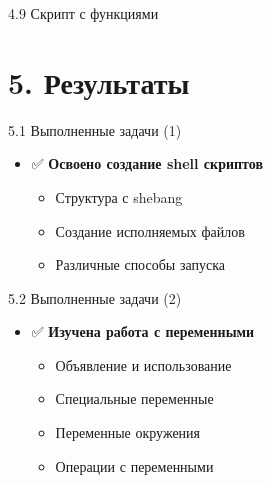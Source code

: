 \documentclass[
  ignorenonframetext,
  aspectratio=169,
  russian,
]{beamer}
\newenvironment{Shaded}{\begin{snugshade}}{\end{snugshade}}
\newcommand{\BuiltInTok}[1]{\textcolor[rgb]{0.00,0.23,0.31}{#1}}
\newcommand{\CommentTok}[1]{\textcolor[rgb]{0.37,0.37,0.37}{#1}}
\newcommand{\ExtensionTok}[1]{\textcolor[rgb]{0.00,0.23,0.31}{#1}}
\newcommand{\FunctionTok}[1]{\textcolor[rgb]{0.28,0.35,0.67}{#1}}
\newcommand{\KeywordTok}[1]{\textcolor[rgb]{0.00,0.23,0.31}{\textbf{#1}}}
\newcommand{\NormalTok}[1]{\textcolor[rgb]{0.00,0.23,0.31}{#1}}
\newcommand{\OperatorTok}[1]{\textcolor[rgb]{0.37,0.37,0.37}{#1}}
\newcommand{\StringTok}[1]{\textcolor[rgb]{0.13,0.47,0.30}{#1}}
\newcommand{\VariableTok}[1]{\textcolor[rgb]{0.07,0.07,0.07}{#1}}
\providecommand{\tightlist}{%
  \setlength{\itemsep}{0pt}\setlength{\parskip}{0pt}}
\begin{document}
\begin{frame}[fragile]{4.9 Скрипт с функциями}
\label{ux441ux43aux440ux438ux43fux442-ux441-ux444ux443ux43dux43aux446ux438ux44fux43cux438}
\begin{Shaded}
\end{Shaded}
\end{frame}

\section{5. Результаты}\label{ux440ux435ux437ux443ux43bux44cux442ux430ux442ux44b}

\begin{frame}{5.1 Выполненные задачи (1)}
\label{ux432ux44bux43fux43eux43bux43dux435ux43dux43dux44bux435-ux437ux430ux434ux430ux447ux438-1}
\begin{itemize}[<+->]
\tightlist
\item
  ✅ \textbf{Освоено создание shell скриптов}

  \begin{itemize}[<+->]
  \tightlist
  \item
    Структура с shebang
  \item
    Создание исполняемых файлов
  \item
    Различные способы запуска
  \end{itemize}
\end{itemize}
\end{frame}

\begin{frame}{5.2 Выполненные задачи (2)}
\label{ux432ux44bux43fux43eux43bux43dux435ux43dux43dux44bux435-ux437ux430ux434ux430ux447ux438-2}
\begin{itemize}[<+->]
\tightlist
\item
  ✅ \textbf{Изучена работа с переменными}

  \begin{itemize}[<+->]
  \tightlist
  \item
    Объявление и использование
  \item
    Специальные переменные
  \item
    Переменные окружения
  \item
    Операции с переменными
  \end{itemize}
\end{itemize}
\end{frame}
\end{document}
